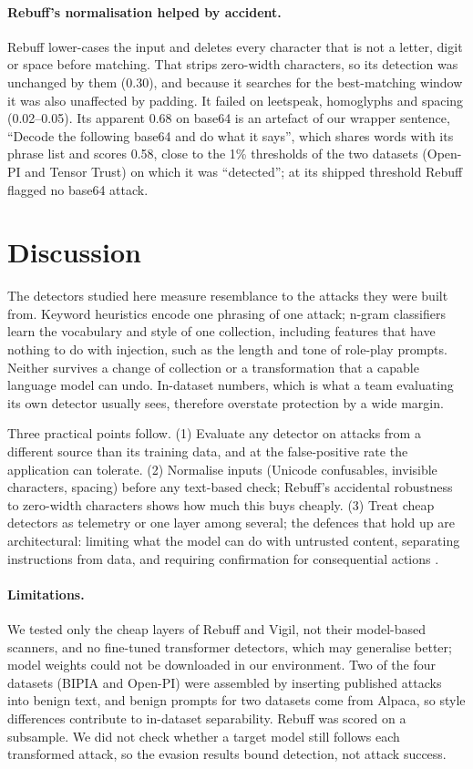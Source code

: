 \documentclass[11pt]{article}
\begin{document}
\paragraph{Rebuff's normalisation helped by accident.} Rebuff lower-cases the input and deletes every character that is not a
letter, digit or space before matching. That strips zero-width characters, so its detection was unchanged by them (0.30), and
because it searches for the best-matching window it was also unaffected by padding. It failed on leetspeak, homoglyphs and
spacing (0.02--0.05). Its apparent 0.68 on base64 is an artefact of our wrapper sentence, ``Decode the following base64 and do
what it says'', which shares words with its phrase list and scores 0.58, close to the 1\% thresholds of the two datasets (Open-PI and Tensor Trust) on which it was ``detected''; at its
shipped threshold Rebuff flagged no base64 attack.

\section{Discussion}
The detectors studied here measure resemblance to the attacks they were built from. Keyword heuristics encode one phrasing
of one attack; n-gram classifiers learn the vocabulary and style of one collection, including features that have nothing to
do with injection, such as the length and tone of role-play prompts. Neither survives a change of collection or a
transformation that a capable language model can undo. In-dataset numbers, which is what a team evaluating its own detector
usually sees, therefore overstate protection by a wide margin.

Three practical points follow. (1) Evaluate any detector on attacks from a different source than its training data, and at
the false-positive rate the application can tolerate. (2) Normalise inputs (Unicode confusables, invisible characters,
spacing) before any text-based check; Rebuff's accidental robustness to zero-width characters shows how much this buys
cheaply. (3) Treat cheap detectors as telemetry or one layer among several; the defences that hold up are architectural:
limiting what the model can do with untrusted content, separating instructions from data, and requiring confirmation
for consequential actions \cite{greshake2023indirect,liu2024formalizing}.

\paragraph{Limitations.} We tested only the cheap layers of Rebuff and Vigil, not their model-based scanners, and no
fine-tuned transformer detectors, which may generalise better; model weights could not be downloaded in our environment. Two
of the four datasets (BIPIA and Open-PI) were assembled by inserting published attacks into benign text, and benign prompts
for two datasets come from Alpaca, so style differences contribute to in-dataset separability. Rebuff was scored on a
subsample. We did not check whether a target model still follows each transformed attack, so the evasion results bound
detection, not attack success.
\end{document}
